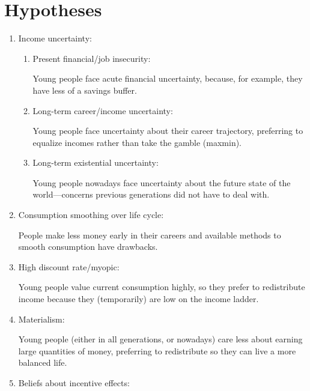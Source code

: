 \documentclass[12pt]{article}
\begin{document}
\section*{Hypotheses}

\begin{enumerate}
    \item Income uncertainty: 
    \begin{enumerate}
        \item Present financial/job insecurity: 
        
        Young people face acute financial uncertainty, because, for example, they have less of a savings buffer.
        \item Long-term career/income uncertainty: 
        
        Young people face uncertainty about their career trajectory, preferring to equalize incomes rather than take the gamble (maxmin).
        
        \item Long-term existential uncertainty: 

        Young people nowadays face uncertainty about the future state of the world---concerns previous generations did not have to deal with.
    \end{enumerate}
    \item Consumption smoothing over life cycle: 

    People make less money early in their careers and available methods to smooth consumption have drawbacks.
    
    \item High discount rate/myopic: 

    Young people value current consumption highly, so they prefer to redistribute income because they (temporarily) are low on the income ladder.
    
    \item Materialism: 

    Young people (either in all generations, or nowadays) care less about earning large quantities of money, preferring to redistribute so they can live a more balanced life.
    
    \item Beliefs about incentive effects:


\end{enumerate}
\end{document}
